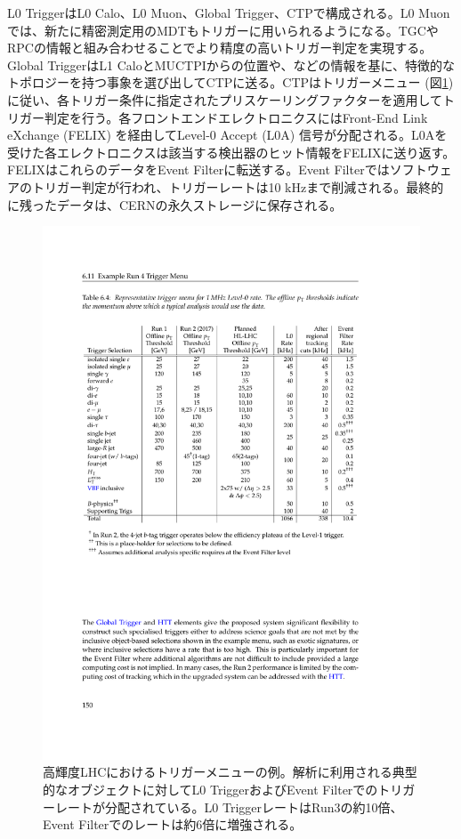 L0 TriggerはL0 Calo、L0 Muon、Global Trigger、CTPで構成される。L0 Muonでは、新たに精密測定用のMDTもトリガーに用いられるようになる。TGCやRPCの情報と組み合わせることでより精度の高いトリガー判定を実現する。Global TriggerはL1 CaloとMUCTPIからの位置や\pt、\Et などの情報を基に、特徴的なトポロジーを持つ事象を選び出してCTPに送る。CTPはトリガーメニュー (図\ref{Phase2_Triggermenu}) に従い、各トリガー条件に指定されたプリスケーリングファクターを適用してトリガー判定を行う。各フロントエンドエレクトロニクスにはFront-End Link eXchange  (FELIX) を経由してLevel-0 Accept (L0A) 信号が分配される。L0Aを受けた各エレクトロニクスは該当する検出器のヒット情報をFELIXに送り返す。FELIXはこれらのデータをEvent Filterに転送する。Event Filterではソフトウェアのトリガー判定が行われ、トリガーレートは10 kHzまで削減される。最終的に残ったデータは、CERNの永久ストレージに保存される。

\begin{figure} 
\centering
\includegraphics[width=16cm]{fig/Intro/Phase2_Triggermenu.pdf}
\caption[高輝度LHCにおけるトリガーメニューの例]{高輝度LHCにおけるトリガーメニューの例\cite{tdr_phase2tdaq_2017020}。解析に利用される典型的なオブジェクトに対してL0 TriggerおよびEvent Filterでのトリガーレートが分配されている。L0 TriggerレートはRun3の約10倍、Event Filterでのレートは約6倍に増強される。}
\label{Phase2_Triggermenu}
\end{figure}


